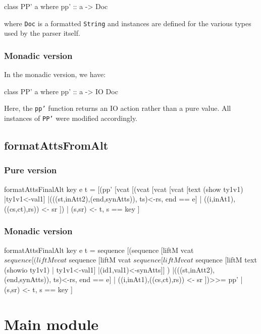\documentclass[../main.tex]{subfiles}
\begin{document}
\begin{code}
	class PP' a where
	pp' :: a -> Doc
\end{code}

where \texttt{Doc} is a formatted \texttt{String} and instances are defined for the various types
used by the parser itself.
 
\subsubsection{Monadic version}

In the monadic version, we have:

\begin{code}
	class PP' a where
	pp' :: a -> IO Doc
\end{code}

Here, the \texttt{pp'} function returns an IO action rather than a pure value.
All instances of \texttt{PP'} were modified accordingly.

\subsection{formatAttsFromAlt}

\subsubsection{Pure version}
\begin{code}
formatAttsFinalAlt  key e t  =
   [(pp' [vcat [(vcat [vcat [vcat [text (show ty1v1)  |ty1v1<-val1]
   |(((st,inAtt2),(end,synAtts)), ts)<-rs, end == e]                             
   | ((i,inAt1),((cs,ct),rs)) <- sr ])
   | (s,sr) <- t, s == key ] 

\end{code}

\subsubsection{Monadic version}
\begin{code}
formatAttsFinalAlt  key e t  =
  sequence [(sequence [liftM vcat $ sequence
    [(liftM vcat $ sequence
	  [liftM vcat $ sequence
	    [liftM vcat $ sequence
		  [liftM text (showio ty1v1) | ty1v1<-val1]
		 |(id1,val1)<-synAtts]] )
       |(((st,inAtt2),(end,synAtts)), ts)<-rs, end == e]
      | ((i,inAt1),((cs,ct),rs)) <- sr ])>>= pp'
     | (s,sr) <- t, s == key ]
\end{code}


\section{Main module}
\end{document}
